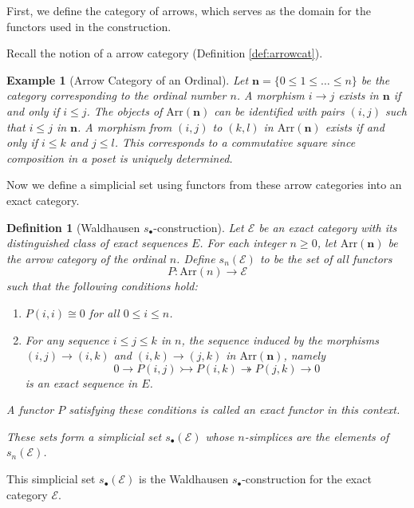 \documentclass[12pt]{report}
\numberwithin{equation}{section}
\newtheorem{definition}[dummy]{Definition}
\newtheorem{example}[dummy]{Example}
\begin{document}
	
	First, we define the category of arrows, which serves as the domain for the functors used in the construction.
	
	Recall the notion of a arrow category (Definition \ref{def:arrowcat}).
	
	\begin{example}[Arrow Category of an Ordinal]
		Let $\mathbf{n} = \{0 \leq 1 \leq \dots \leq n\}$ be the category corresponding to the ordinal number $n$. A morphism $i \to j$ exists in $\mathbf{n}$ if and only if $i \leq j$. The objects of $\mathrm{Arr}(\mathbf{n})$ can be identified with pairs $(i, j)$ such that $i \leq j$ in $\mathbf{n}$. A morphism from $(i, j)$ to $(k, l)$ in $\mathrm{Arr}(\mathbf{n})$ exists if and only if $i \leq k$ and $j \leq l$. This corresponds to a commutative square since composition in a poset is uniquely determined.
	\end{example}
	
	Now we define a simplicial set using functors from these arrow categories into an exact category.
	
	\begin{definition}[Waldhausen \( s_\bullet \)-construction]
		Let $\mathcal{E}$ be an exact category with its distinguished class of exact sequences $E$. For each integer $n \geq 0$, let $\mathrm{Arr}(\mathbf{n})$ be the arrow category of the ordinal $n$.
		Define $s_n(\mathcal{E})$ to be the set of all functors
		\[ P: \mathrm{Arr}(n) \to \mathcal{E} \]
		such that the following conditions hold:
		\begin{enumerate}
			\item $P(i, i) \cong 0$ for all $0 \leq i \leq n$.
			\item For any sequence $i \leq j \leq k$ in $n$, the sequence induced by the morphisms $(i,j) \to (i,k)$ and $(i,k) \to (j,k)$ in $\mathrm{Arr}(\mathbf{n})$, namely
			\[ 0 \to P(i, j) \rightarrowtail P(i, k) \twoheadrightarrow P(j, k) \to 0 \]
			is an exact sequence in $E$.
		\end{enumerate}
		A functor $P$ satisfying these conditions is called an exact functor in this context.
		
		These sets form a simplicial set $s_\bullet(\mathcal{E})$ whose $n$-simplices are the elements of $s_n(\mathcal{E})$.
	\end{definition}
	
	This simplicial set $s_\bullet(\mathcal{E})$ is the Waldhausen \( s_\bullet \)-construction for the exact category $\mathcal{E}$.
	
\end{document}
